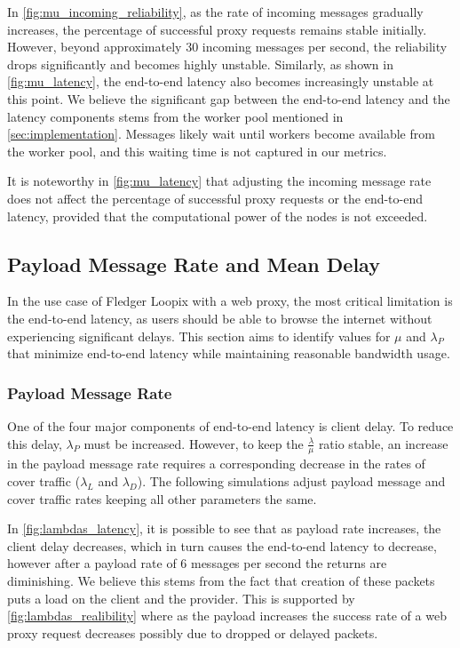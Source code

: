 \documentclass[a4paper,11pt,oneside]{report}
\begin{document}
In \autoref{fig:mu_incoming_reliability}, as the rate of incoming messages gradually increases, the percentage of successful proxy requests remains stable initially. However, beyond approximately 30 incoming messages per second, the reliability drops significantly and becomes highly unstable. Similarly, as shown in \autoref{fig:mu_latency}, the end-to-end latency also becomes increasingly unstable at this point. We believe the significant gap between the end-to-end latency and the latency components stems from the worker pool mentioned in \autoref{sec:implementation}. Messages likely wait until workers become available from the worker pool, and this waiting time is not captured in our metrics.

It is noteworthy in \autoref{fig:mu_latency} that adjusting the incoming message rate does not affect the percentage of successful proxy requests or the end-to-end latency, provided that the computational power of the nodes is not exceeded.
\subsection{Payload Message Rate and Mean Delay}
In the use case of Fledger Loopix with a web proxy, the most critical limitation is the end-to-end latency, as users should be able to browse the internet without experiencing significant delays. This section aims to identify values for \(\mu\) and \(\lambda_P\) that minimize end-to-end latency while maintaining reasonable bandwidth usage.

\subsubsection{Payload Message Rate}
One of the four major components of end-to-end latency is client delay. To reduce this delay, \(\lambda_P\) must be increased. However, to keep the \(\frac{\lambda}{\mu}\) ratio stable, an increase in the payload message rate requires a corresponding decrease in the rates of cover traffic (\(\lambda_L\) and \(\lambda_D\)). The following simulations adjust payload message and cover traffic rates keeping all other parameters the same.

In \autoref{fig:lambdas_latency}, it is possible to see that as payload rate increases, the client delay decreases, which in turn causes the end-to-end latency to decrease, however after a payload rate of 6 messages per second the returns are diminishing. We believe this stems from the fact that creation of these packets puts a load on the client and the provider. This is supported by \autoref{fig:lambdas_realibility} where as the payload increases the success rate of a web proxy request decreases possibly due to dropped or delayed packets.
\end{document}
